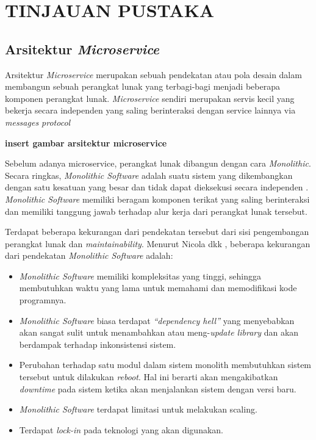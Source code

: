 \chapter{TINJAUAN PUSTAKA}

\vspace{4.5pt}
\setlength{\parskip}{0.5em}

\section{Arsitektur \textit{Microservice}} \label{sec:Arsitektur Microservice}
Arsitektur \textit{Microservice} merupakan sebuah pendekatan atau pola desain dalam membangun sebuah perangkat lunak
yang terbagi-bagi menjadi beberapa komponen perangkat lunak. \textit{Microservice} sendiri merupakan
servis kecil yang bekerja secara independen yang saling berinteraksi dengan service lainnya via \textit{messages protocol} \cite{Newman2015}

\textbf{insert gambar arsitektur microservice}

Sebelum adanya microservice, perangkat lunak dibangun dengan cara \textit{Monolithic}. Secara ringkas, \textit{Monolithic Software} adalah suatu
sistem yang dikembangkan dengan satu kesatuan yang besar dan tidak dapat dieksekusi secara independen \cite{Nicola2017}.
\textit{Monolithic Software} memiliki beragam komponen terikat yang saling berinteraksi dan memiliki
tanggung jawab terhadap alur kerja dari perangkat lunak tersebut.

Terdapat beberapa kekurangan dari pendekatan tersebut dari sisi pengembangan perangkat lunak dan \textit{maintainability}.
Menurut Nicola dkk \cite{Nicola2017}, beberapa kekurangan dari pendekatan \textit{Monolithic Software} adalah:
\begin{itemize}
    \item \textit{Monolithic Software} memiliki kompleksitas yang tinggi, sehingga membutuhkan waktu yang lama untuk
          memahami dan memodifikasi kode programnya.
    \item \textit{Monolithic Software} biasa terdapat \textit{``dependency hell''} yang menyebabkan akan sangat sulit untuk
          menambahkan atau meng-\textit{update library} dan akan berdampak terhadap inkonsistensi sistem.
    \item Perubahan terhadap satu modul dalam sistem monolith membutuhkan sistem tersebut untuk dilakukan \textit{reboot}.
          Hal ini berarti akan mengakibatkan \textit{downtime} pada sistem ketika akan menjalankan sistem dengan versi baru.
    \item \textit{Monolithic Software} terdapat limitasi untuk melakukan scaling.
    \item Terdapat \textit{lock-in} pada teknologi yang akan digunakan.
\end{itemize}

